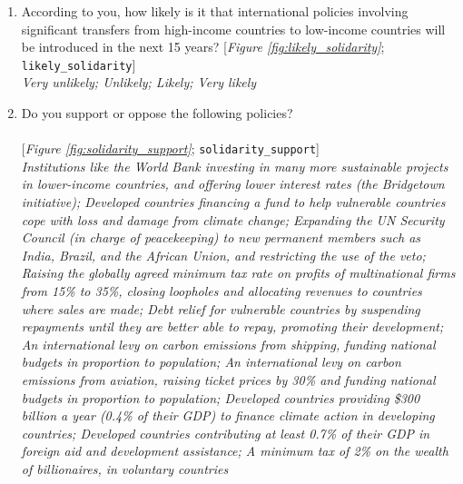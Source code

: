 \begin{enumerate}[resume]
\item  \label{q:likely_solidarity} According to you, how likely is it that international policies involving significant transfers from high-income countries to low-income countries will be introduced in the next 15 years? [\textit{Figure \ref{fig:likely_solidarity}}; 
\verb|likely_solidarity|]
  \\ \textit{Very unlikely; Unlikely; Likely; Very likely}

\item  \label{q:solidarity_support} Do you support or oppose the following policies?\\
\\
[developed\_note\_long: (As some items refer to \&quot;developed countries\&quot;, note that we consider Saudi Arabia to be a developed country in this question.)] [\textit{Figure \ref{fig:solidarity_support}}; 
\verb|solidarity_support|]
  \\ \textit{Institutions like the World Bank investing in many more sustainable projects in lower-income countries, and offering lower interest rates (the Bridgetown initiative); Developed countries financing a fund to help vulnerable countries cope with loss and damage from climate change; Expanding the UN Security Council (in charge of peacekeeping) to new permanent members such as India, Brazil, and the African Union, and restricting the use of the veto; Raising the globally agreed minimum tax rate on profits of multinational firms from 15\% to 35\%, closing loopholes and allocating revenues to countries where sales are made; Debt relief for vulnerable countries by suspending repayments until they are better able to repay, promoting their development; An international levy on carbon emissions from shipping, funding national budgets in proportion to population; An international levy on carbon emissions from aviation, raising ticket prices by 30\% and funding national budgets in proportion to population; Developed countries providing \$300 billion a year (0.4\% of their GDP) to finance climate action in developing countries; Developed countries contributing at least 0.7\% of their GDP in foreign aid and development assistance; A minimum tax of 2\% on the wealth of billionaires, in voluntary countries}

\end{enumerate} 


